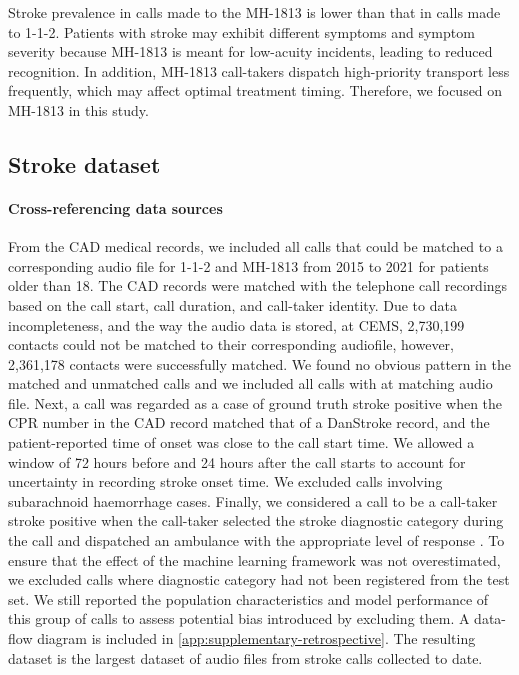{Stroke prevalence in calls made to the MH-1813 is lower than that in calls made to 1-1-2. Patients with stroke may exhibit different symptoms and symptom severity because MH-1813 is meant for low-acuity incidents, leading to reduced recognition. In addition, MH-1813 call-takers dispatch high-priority transport less frequently, which may affect optimal treatment timing. Therefore, we focused on MH-1813 in this study.

\subsection{Stroke dataset}

\paragraph{Cross-referencing data sources}

From the CAD medical records, we included all calls that could be matched to a corresponding audio file for 1-1-2 and MH-1813 from 2015 to 2021 for patients older than 18. The CAD records were matched with the telephone call recordings based on the call start, call duration, and call-taker identity. Due to data incompleteness, and the way the audio data is stored, at CEMS, 2,730,199 contacts could not be matched to their corresponding audiofile, however, 2,361,178 contacts were successfully matched. We found no obvious pattern in the matched and unmatched calls and we included all calls with at matching audio file. Next, a call was regarded as a case of ground truth stroke positive when the CPR number in the CAD record matched that of a DanStroke record, and the patient-reported time of onset was close to the call start time. We allowed a window of 72 hours before and 24 hours after the call starts to account for uncertainty in recording stroke onset time. We excluded calls involving subarachnoid haemorrhage cases. Finally, we considered a call to be a call-taker stroke positive when the call-taker selected the stroke diagnostic category during the call and dispatched an ambulance with the appropriate level of response \parencite{cite20}. To ensure that the effect of the machine learning framework was not overestimated, we excluded calls where diagnostic category had not been registered from the test set. We still reported the population characteristics and model performance of this group of calls to assess potential bias introduced by excluding them. A data-flow diagram is included in \cref{app:supplementary-retrospective}. The resulting dataset is the largest dataset of audio files from stroke calls collected to date. 

}
